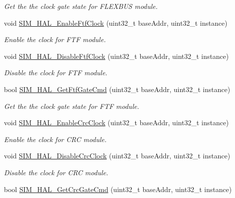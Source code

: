 \begin{DoxyCompactItemize}
\begin{DoxyCompactList}\small\item\em Get the the clock gate state for F\+L\+E\+X\+B\+US module. \end{DoxyCompactList}\item 
void \hyperlink{group__sim__hal_ga562f79a0b3caf75623feb80da50f8f8d}{S\+I\+M\+\_\+\+H\+A\+L\+\_\+\+Enable\+Ftf\+Clock} (uint32\+\_\+t base\+Addr, uint32\+\_\+t instance)
\begin{DoxyCompactList}\small\item\em Enable the clock for F\+TF module. \end{DoxyCompactList}\item 
void \hyperlink{group__sim__hal_ga139cbf56f42f4bc90f514de53c24dabd}{S\+I\+M\+\_\+\+H\+A\+L\+\_\+\+Disable\+Ftf\+Clock} (uint32\+\_\+t base\+Addr, uint32\+\_\+t instance)
\begin{DoxyCompactList}\small\item\em Disable the clock for F\+TF module. \end{DoxyCompactList}\item 
bool \hyperlink{group__sim__hal_gad539d227bf49a65c8102a82b324de338}{S\+I\+M\+\_\+\+H\+A\+L\+\_\+\+Get\+Ftf\+Gate\+Cmd} (uint32\+\_\+t base\+Addr, uint32\+\_\+t instance)
\begin{DoxyCompactList}\small\item\em Get the the clock gate state for F\+TF module. \end{DoxyCompactList}\item 
void \hyperlink{group__sim__hal_ga1442dc91ab5889d36968a461357f4b51}{S\+I\+M\+\_\+\+H\+A\+L\+\_\+\+Enable\+Crc\+Clock} (uint32\+\_\+t base\+Addr, uint32\+\_\+t instance)
\begin{DoxyCompactList}\small\item\em Enable the clock for C\+RC module. \end{DoxyCompactList}\item 
void \hyperlink{group__sim__hal_ga63d3b6afdb4dbc817d011e08db787e6d}{S\+I\+M\+\_\+\+H\+A\+L\+\_\+\+Disable\+Crc\+Clock} (uint32\+\_\+t base\+Addr, uint32\+\_\+t instance)
\begin{DoxyCompactList}\small\item\em Disable the clock for C\+RC module. \end{DoxyCompactList}\item 
bool \hyperlink{group__sim__hal_ga3e5bef6f9596388af87f066b8eabed46}{S\+I\+M\+\_\+\+H\+A\+L\+\_\+\+Get\+Crc\+Gate\+Cmd} (uint32\+\_\+t base\+Addr, uint32\+\_\+t instance)

\end{DoxyCompactItemize}
